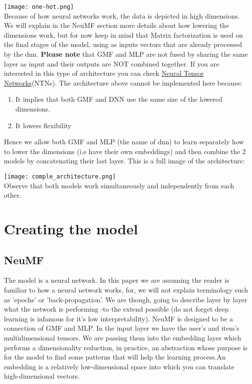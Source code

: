 \documentclass[]{article}
\begin{document}
\begin{center}
	\texttt{[image: one-hot.png]}
	\\
	Because of how neural networks work, the data is depicted in high dimensions. We will explain in the NeuMF section more details about how lowering the dimensions work, but for now keep in mind that Matrix factorization is used on the final stages of the model, using as inputs vectors that are already processed by the dnn. \textbf{Please note} that GMF and MLP are not fused by sharing the same layer as input and their outputs are NOT combined together. If you are interested in this type of architecture you can check \href{http://deeplearn-ai.com/2017/11/21/neural-tensor-network-exploring-relations-among-text-entities/}{Neural Tensor Networks}(NTNs). The architecture above cannot be implemented here because: \begin{enumerate}
		\item It implies that both GMF and DNN use the same size of the lowered dimensions.
		\item It lowers flexibility
	\end{enumerate}
	Hence we allow both GMF and MLP (the name of dnn) to learn separately how to lower the dimensions (i.e have their own embeddings) and then combine the 2 models by concatenating their last layer. This is a full image of the architecture:
	
	\texttt{[image: comple\_architecture.png]}
	\\
	Observe that both models work simultaneously and independently from each other.
\end{center}

\section{Creating the model}
\subsection{NeuMF}
The model is a neural network. In this paper we are assuming the reader is familiar to how a neural network works, for, we will not explain terminology such as 'epochs' or 'back-propagation'. We are though, going to describe layer by layer what the network is performing -to the extend possible (do not forget deep learning is infamous for it's low interpretability).
NeuMF is designed to be a connection of GMF and MLP. In the input layer we have the user's and item's multidimensional tensors. We are passing them into the embedding layer which performs a dimensionality reduction, in practice, an abstraction whose purpose is for the model to find some patterns that will help the learning process.An embedding is a relatively low-dimensional space into which you can translate high-dimensional vectors.
\end{document}
